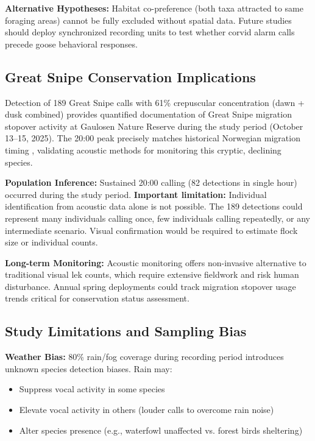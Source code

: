 \documentclass[twocolumn]{article}
\begin{document}
\textbf{Alternative Hypotheses:} Habitat co-preference (both taxa attracted to same foraging areas) cannot be fully excluded without spatial data. Future studies should deploy synchronized recording units to test whether corvid alarm calls precede goose behavioral responses.

\subsection{Great Snipe Conservation Implications}

Detection of 189 Great Snipe calls with 61\% crepuscular concentration (dawn + dusk combined) provides quantified documentation of Great Snipe migration stopover activity at Gaulosen Nature Reserve during the study period (October 13--15, 2025). The 20:00 peak precisely matches historical Norwegian migration timing \citep{Kålås1995}, validating acoustic methods for monitoring this cryptic, declining species.

\textbf{Population Inference:} Sustained 20:00 calling (82 detections in single hour) occurred during the study period. \textbf{Important limitation:} Individual identification from acoustic data alone is not possible. The 189 detections could represent many individuals calling once, few individuals calling repeatedly, or any intermediate scenario. Visual confirmation would be required to estimate flock size or individual counts.

\textbf{Long-term Monitoring:} Acoustic monitoring offers non-invasive alternative to traditional visual lek counts, which require extensive fieldwork and risk human disturbance. Annual spring deployments could track migration stopover usage trends critical for conservation status assessment.

\subsection{Study Limitations and Sampling Bias}

\textbf{Weather Bias:} 80\% rain/fog coverage during recording period introduces unknown species detection biases. Rain may:
\begin{itemize}
\item Suppress vocal activity in some species
\item Elevate vocal activity in others (louder calls to overcome rain noise)
\item Alter species presence (e.g., waterfowl unaffected vs. forest birds sheltering)
\end{itemize}
\end{document}
